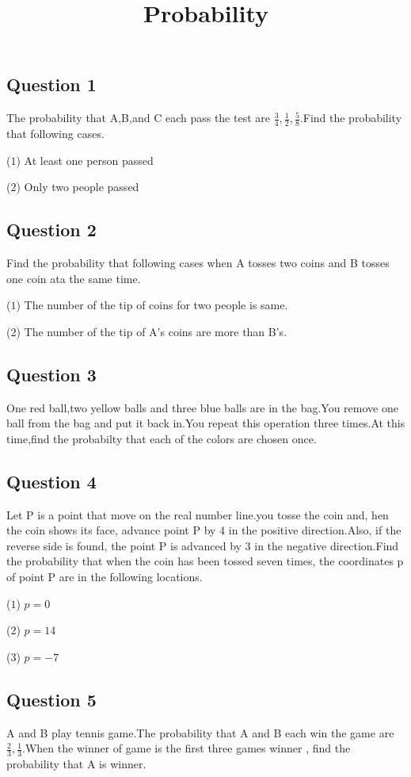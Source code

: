 \documentclass[12pt]{jarticle}
\title{Probability}
\begin{document}
\date{}
\maketitle
\vspace{-2cm}
\subsection*{Question 1}
The probability that A,B,and C each pass the test are $\displaystyle \frac{3}{4}, \frac{1}{2}, \frac{5}{8}$.Find the probability that following cases.

($1$) At least one person passed

($2$) Only two people passed

\subsection*{Question 2}
Find the probability that following cases when A tosses two coins and B tosses one coin ata the same time.

($1$) The number of the tip of coins for two people is same.

($2$) The number of the tip of A's coins are more than B's.

\subsection*{Question 3}
One red ball,two yellow balls  and three blue balls are in the bag.You remove one ball from the bag and put it back in.You repeat this operation three times.At this time,find the probabilty that each of the colors are chosen once.

\subsection*{Question 4}
Let P is a point that move on the real number line.you tosse the coin and, hen the coin shows its face, advance point P by 4 in the positive direction.Also, if the reverse side is found, the point P is advanced by 3 in the negative direction.Find the probability that when the coin has been tossed seven times, the coordinates p of point P are in the following locations.

($1$) $p = 0$

($2$) $p = 14$

($3$) $p = -7$

\subsection*{Question 5}
A and B play tennis game.The probability that A and B each win the game are $\displaystyle \frac{2}{3}, \frac{1}{3}$.When the winner of game  is  the first three games winner , find the probability that A is winner.
\end{document}
